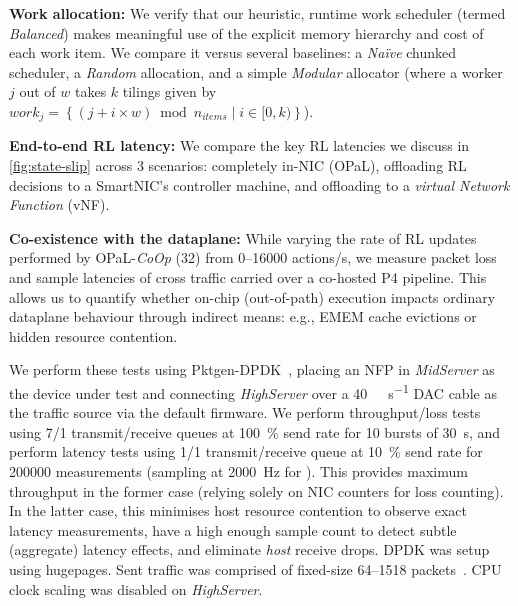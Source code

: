 \documentclass[
sigconf,natbib=false
,anonymous=true
,10pt
]{acmart}
\newcommand{\fakepara}[1]{\noindent\textbf{#1:}}
\newcommand{\approachshort}{OPaL}
\newcommand{\Coopfw}{\emph{CoOp}}
\begin{document}
\fakepara{Work allocation}
We verify that our heuristic, runtime work scheduler (termed \emph{Balanced}) makes meaningful use of the explicit memory hierarchy and cost of each work item.
We compare it versus several baselines: a \emph{Na\"{i}ve} chunked scheduler, a \emph{Random} allocation, and a simple \emph{Modular} allocator (where a worker $j$ out of $w$ takes $k$ tilings given by $\mathit{work}_j=\left\{\left(j + i \times w\right) \bmod n_{\mathit{items}} \mid i \in [0,k) \right\}$).

\fakepara{End-to-end RL latency}
We compare the key RL latencies we discuss in \cref{fig:state-slip} across 3 scenarios: completely in-NIC (\approachshort{}), offloading RL decisions to a SmartNIC's controller machine, and offloading to a \emph{virtual Network Function} (vNF).

\fakepara{Co-existence with the dataplane}
While varying the rate of RL updates performed by \approachshort{}-\Coopfw{} (\SI{32}{\bit}) from \numrange{0}{16000} actions/s, we measure packet loss and sample latencies of cross traffic carried over a co-hosted P4 pipeline.
This allows us to quantify whether on-chip (out-of-path) execution impacts ordinary dataplane behaviour through indirect means: e.g., EMEM cache evictions or hidden resource contention.

We perform these tests using Pktgen-DPDK~\cite{pktgen-dpdk}, placing an NFP in \emph{MidServer} as the device under test and connecting \emph{HighServer} over a \SI{40}{\giga\bit\per\second} DAC cable as the traffic source via the default firmware.
We perform throughput/loss tests using \num{7}/\num{1} transmit/receive queues at \SI{100}{\percent} send rate for 10 bursts of \SI{30}{\second}, and perform latency tests using \num{1}/\num{1} transmit/receive queue at \SI{10}{\percent} send rate for \num{200000} measurements (sampling at \SI{2000}{\hertz} for ).
This provides maximum throughput in the former case (relying solely on NIC counters for loss counting).
In the latter case, this minimises host resource contention to observe exact latency measurements, have a high enough sample count to detect subtle (aggregate) latency effects, and eliminate \emph{host} receive drops.
DPDK was setup using  hugepages.
Sent traffic was comprised of fixed-size \SIrange{64}{1518}{\byte} packets~\cite{rfc2544}.
CPU clock scaling was disabled on \emph{HighServer}.
\end{document}
